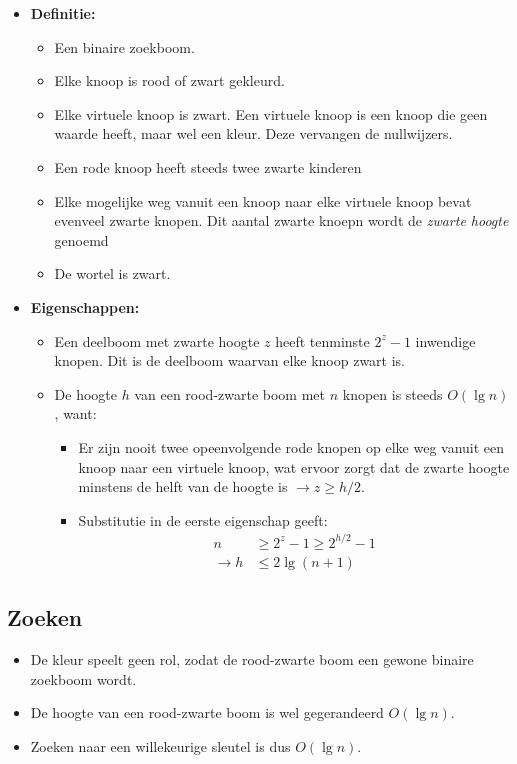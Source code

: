 \label{sec:rood-zwarte bomen}
\begin{itemize}
    \item \textbf{Definitie:}
    \begin{itemize}
        \item Een binaire zoekboom.
        \item Elke knoop is rood of zwart gekleurd.
        \item Elke virtuele knoop is zwart. Een virtuele knoop is een knoop die geen waarde heeft, maar wel een kleur. Deze vervangen de nullwijzers.
        \item Een rode knoop heeft steeds twee zwarte kinderen
        \item Elke mogelijke weg vanuit een knoop naar elke virtuele knoop bevat evenveel zwarte knopen. Dit aantal zwarte knoepn wordt de \textit{zwarte hoogte} genoemd
        \item De wortel is zwart.
    \end{itemize}
    \item \textbf{Eigenschappen:}
    \begin{itemize}
        \item Een deelboom met zwarte hoogte $z$ heeft tenminste $2^z - 1$ inwendige knopen. Dit is de deelboom waarvan elke knoop zwart is.
        \item De hoogte $h$ van een rood-zwarte boom met $n$ knopen is steeds $O(\lg n)$, want:
        \begin{itemize}
            \item Er zijn nooit twee opeenvolgende rode knopen op elke weg vanuit een knoop naar een virtuele knoop, wat ervoor zorgt dat de zwarte hoogte minstens de helft van de hoogte is $\rightarrow z \geq h/2$.
            \item Substitutie in de eerste eigenschap geeft:
            \begin{align*}
                n &\geq 2^z - 1 \geq 2^{h/2} - 1 \\
                \rightarrow h & \leq 2\lg(n + 1)
            \end{align*}
        \end{itemize}
    \end{itemize}

\end{itemize}
\subsection{Zoeken}
\begin{itemize}
    \item De kleur speelt geen rol, zodat de rood-zwarte boom een gewone binaire zoekboom wordt.
    \item De hoogte van een rood-zwarte boom is wel gegerandeerd $O(\lg n)$.
    \item Zoeken naar een willekeurige sleutel is dus $O(\lg n)$.
\end{itemize}

